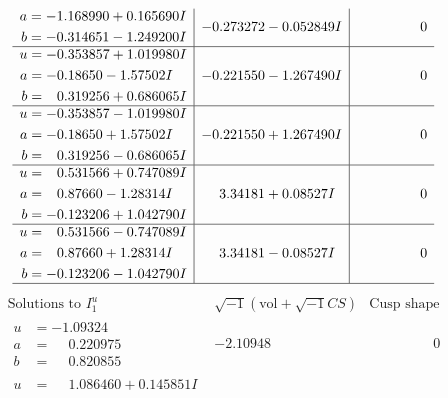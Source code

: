 \documentclass[1p]{elsarticle_modified}
\theoremstyle{definition}
\newcommand{\I}{\sqrt{-1}}
\begin{document}
$$\begin{array}{c|c|c}
\begin{aligned}
a &= -1.168990 + 0.165690 I \\
b &= -0.314651 - 1.249200 I\end{aligned}
 & -0.273272 - 0.052849 I & \phantom{-0.000000 } 0 \\ \hline\begin{aligned}
u &= -0.353857 + 1.019980 I \\
a &= -0.18650 - 1.57502 I \\
b &= \phantom{-}0.319256 + 0.686065 I\end{aligned}
 & -0.221550 - 1.267490 I & \phantom{-0.000000 } 0 \\ \hline\begin{aligned}
u &= -0.353857 - 1.019980 I \\
a &= -0.18650 + 1.57502 I \\
b &= \phantom{-}0.319256 - 0.686065 I\end{aligned}
 & -0.221550 + 1.267490 I & \phantom{-0.000000 } 0 \\ \hline\begin{aligned}
u &= \phantom{-}0.531566 + 0.747089 I \\
a &= \phantom{-}0.87660 - 1.28314 I \\
b &= -0.123206 + 1.042790 I\end{aligned}
 & \phantom{-}3.34181 + 0.08527 I & \phantom{-0.000000 } 0 \\ \hline\begin{aligned}
u &= \phantom{-}0.531566 - 0.747089 I \\
a &= \phantom{-}0.87660 + 1.28314 I \\
b &= -0.123206 - 1.042790 I\end{aligned}
 & \phantom{-}3.34181 - 0.08527 I & \phantom{-0.000000 } 0\\
 \hline 
 \end{array}$$\newpage$$\begin{array}{c|c|c}  
\text{Solutions to }I^u_{1}& \I (\text{vol} + \sqrt{-1}CS) & \text{Cusp shape}\\
 \hline 
\begin{aligned}
u &= -1.09324\phantom{ +0.000000I} \\
a &= \phantom{-}0.220975\phantom{ +0.000000I} \\
b &= \phantom{-}0.820855\phantom{ +0.000000I}\end{aligned}
 & -2.10948\phantom{ +0.000000I} & \phantom{-0.000000 } 0 \\ \hline\begin{aligned}
u &= \phantom{-}1.086460 + 0.145851 I \\

\end{aligned}
\end{array}$$
\end{document}
